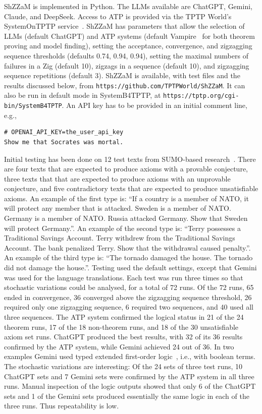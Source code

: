 \documentclass[letterpaper]{article}
\newcommand{\smalltt}[1]{{\small \tt #1}}
\begin{document}
ShZZaM is implemented in Python.
The LLMs available are ChatGPT, Gemini, Claude, and DeepSeek.
Access to ATP is provided via the TPTP World's SystemOnTPTP service~\cite{Sut00-CADE-17}.
ShZZaM has parameters that allow the selection of LLMs (default ChatGPT) and ATP systems (default
Vampire~\cite{BB+25} for both theorem proving and model finding), setting the acceptance,
convergence, and zigzagging sequence thresholds (defaults 0.74, 0.94, 0.94), setting the maximal
numbers of failures in a Zig (default 10), zigzags in a sequence (default 10), and zigzagging
sequence repetitions (default 3).
ShZZaM is available, with test files and the results discussed below, from 
\smalltt{https://github.com/TPTPWorld/ShZZaM}.
It can also be run in default mode in SystemB4TPTP, at 
\smalltt{https://tptp.org/cgi-bin/SystemB4TPTP}.
An API key has to be provided in an initial comment line, e.g.,
\begin{verbatim}
# OPENAI_API_KEY=the_user_api_key
Show me that Socrates was mortal.
\end{verbatim}

\vspace*{-1em}
Initial testing has been done on 12 test texts from SUMO-based research~\cite{NP01,TP+25-NeSy}.
There are four texts that are expected to produce axioms with a provable conjecture, three texts
that that are expected to produce axioms with an unprovable conjecture, and five contradictory
texts that are expected to produce unsatisfiable axioms.
An example of the first type is:
``If a country is a member of NATO, it will protect any member that is attacked. 
Sweden is a member of NATO. 
Germany is a member of NATO.
Russia attacked Germany.
Show that Sweden will protect Germany.''.
An example of the second type is:
``Terry possesses a Traditional Savings Account.
Terry withdrew from the Traditional Savings Account.
The bank penalized Terry.
Show that the withdrawal caused penalty.''.
An example of the third type is:
``The tornado damaged the house.
The tornado did not damage the house.''.
Testing used the default settings, except that Gemini was used for the language translations.
Each test was run three times so that stochastic variations could be analysed, for a total of 
72 runs.
Of the 72 runs, 65 ended in convergence, 36 converged above the zigzagging sequence threshold,
26 required only one zigzagging sequence, 6 required two sequences, and 40 used all three
sequences.
The ATP system confirmed the logical status in 21 of the 24 theorem runs, 17 of the 18 non-theorem
runs, and 18 of the 30 unsatisfiable axiom set runs.
ChatGPT produced the best results, with 32 of its 36 results confirmed by the ATP system,
while Gemini achieved 24 out of 36.
In two examples Gemini used typed extended first-order logic~\cite{SK18}, i.e., with boolean terms.
The stochastic variations are interesting:
Of the 24 sets of three test runs, 10 ChatGPT sets and 7 Gemini sets were confirmed by the ATP
system in all three runs.
Manual inspection of the logic outputs showed that only 6 of the ChatGPT sets and 1 of the Gemini
sets produced essentially the same logic in each of the three runs.
Thus repeatability is low.
\end{document}
